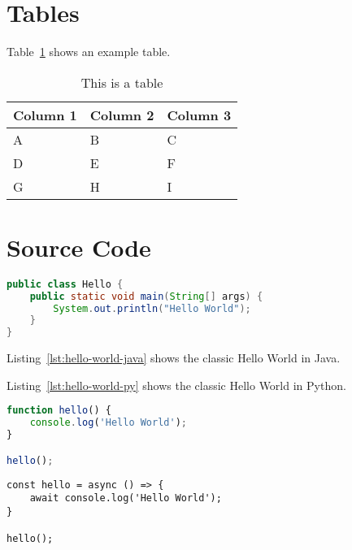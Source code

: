 
\section{Tables}

Table~\ref{tab:table-one} shows an example table.

\begin{table}[htbp]
    \centering
    \caption{This is a table}
    \label{tab:table-one}
    \begin{tabular}{lll}
        \addlinespace
        \toprule
        Column 1 & Column 2 & Column 3 \\
        \midrule
        A     & B     & C \\
        D     & E     & F \\
        G     & H     & I \\
        \bottomrule
    \end{tabular}
\end{table}

\section{Source Code}

\begin{lstlisting}[language=Java, caption=Hello World in Java, label=lst:hello-world-java]
public class Hello {
    public static void main(String[] args) {
        System.out.println("Hello World");
    }
}
\end{lstlisting}

Listing~\ref{lst:hello-world-java} shows the classic Hello World in Java.



Listing~\ref{lst:hello-world-py} shows the classic Hello World in Python.

\begin{lstlisting}[language=JavaScript, caption=Hello World in JavaScript, label=lst:hello-world-javascript]
function hello() {
    console.log('Hello World');
}

hello();
\end{lstlisting}

\newpage
\begin{lstlisting}[language=ES6, caption=Hello World in JavaScript (ES6), label=lst:hello-world-javascript]
const hello = async () => {
    await console.log('Hello World');
}

hello();
\end{lstlisting}
